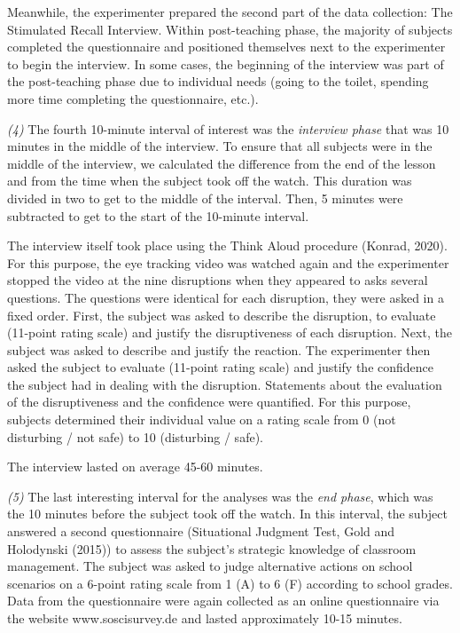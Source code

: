 \documentclass[
  man,floatsintext]{apa6}
\begin{document}
Meanwhile, the experimenter prepared the second part of the data collection: The Stimulated Recall Interview. Within post-teaching phase, the majority of subjects completed the questionnaire and positioned themselves next to the experimenter to begin the interview. In some cases, the beginning of the interview was part of the post-teaching phase due to individual needs (going to the toilet, spending more time completing the questionnaire, etc.).

\emph{(4)} The fourth 10-minute interval of interest was the \emph{interview phase} that was 10 minutes in the middle of the interview. To ensure that all subjects were in the middle of the interview, we calculated the difference from the end of the lesson and from the time when the subject took off the watch. This duration was divided in two to get to the middle of the interval. Then, 5 minutes were subtracted to get to the start of the 10-minute interval.

The interview itself took place using the Think Aloud procedure (Konrad, 2020). For this purpose, the eye tracking video was watched again and the experimenter stopped the video at the nine disruptions when they appeared to asks several questions. The questions were identical for each disruption, they were asked in a fixed order.
First, the subject was asked to describe the disruption, to evaluate (11-point rating scale) and justify the disruptiveness of each disruption. Next, the subject was asked to describe and justify the reaction. The experimenter then asked the subject to evaluate (11-point rating scale) and justify the confidence the subject had in dealing with the disruption. Statements about the evaluation of the disruptiveness and the confidence were quantified. For this purpose, subjects determined their individual value on a rating scale from 0 (not disturbing / not safe) to 10 (disturbing / safe).

The interview lasted on average 45-60 minutes.

\emph{(5)} The last interesting interval for the analyses was the \emph{end phase}, which was the 10 minutes before the subject took off the watch. In this interval, the subject answered a second questionnaire (Situational Judgment Test, Gold and Holodynski (2015)) to assess the subject's strategic knowledge of classroom management. The subject was asked to judge alternative actions on school scenarios on a 6-point rating scale from 1 (A) to 6 (F) according to school grades. Data from the questionnaire were again collected as an online questionnaire via the website www.soscisurvey.de and lasted approximately 10-15 minutes.
\end{document}
